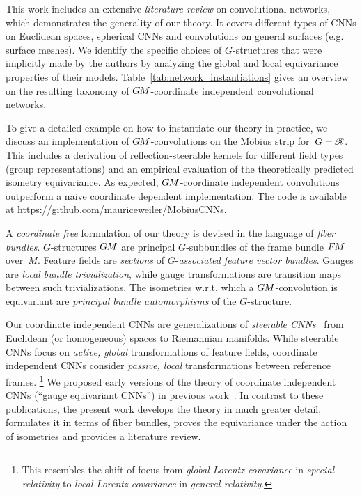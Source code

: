 This work includes an extensive \emph{literature review} on convolutional networks, which demonstrates the generality of our theory.
It covers different types of CNNs on Euclidean spaces, spherical CNNs and convolutions on general surfaces (e.g. surface meshes).
We identify the specific choices of $G$-structures that were implicitly made by the authors by analyzing the global and local equivariance properties of their models.
Table~\ref{tab:network_instantiations} gives an overview on the resulting taxonomy of $G\mkern-1.4muM$-coordinate independent convolutional networks.


To give a detailed example on how to instantiate our theory in practice, we discuss an implementation of $G\mkern-1.4muM$-convolutions on the M\"obius strip for~$G=\mathscr{R}$.
This includes a derivation of reflection-steerable kernels for different field types (group representations) and an empirical evaluation of the theoretically predicted isometry equivariance.
As expected, $G\mkern-1.4muM$-coordinate independent convolutions outperform a naive coordinate dependent implementation.
The code is available at \url{https://github.com/mauriceweiler/MobiusCNNs}.

A \emph{coordinate free} formulation of our theory is devised in the language of \emph{fiber bundles}.
$G$-structures $G\mkern-1.4muM$ are principal $G$-subbundles of the frame bundle $F\mkern-1.5muM$ over~$M$.
Feature fields are \emph{sections} of $G$-\emph{associated feature vector bundles}.
Gauges are \emph{local bundle trivialization}, while gauge transformations are transition maps between such trivializations.
The isometries w.r.t. which a $G\mkern-1.4muM$-convolution is equivariant are \emph{principal bundle automorphisms} of the $G$-structure.


Our coordinate independent CNNs are generalizations of \emph{steerable CNNs}~\cite{Cohen2017-STEER,3d_steerableCNNs,Weiler2019_E2CNN,Cohen2019-generaltheory,lang2020WignerEckart} from Euclidean (or homogeneous) spaces to Riemannian manifolds.
While steerable CNNs focus on \emph{active, global} transformations of feature fields, coordinate independent CNNs consider \emph{passive, local} transformations between reference frames.%
\footnote{
    This resembles the shift of focus from \emph{global Lorentz covariance} in \emph{special relativity} to \emph{local Lorentz covariance} in \emph{general relativity}.
}
We proposed early versions of the theory of coordinate independent CNNs (``gauge equivariant CNNs'') in previous work~\cite{gaugeIco2019,deHaan2020meshCNNs}.
In contrast to these publications, the present work develops the theory in much greater detail, formulates it in terms of fiber bundles, proves the equivariance under the action of isometries and provides a literature review.
